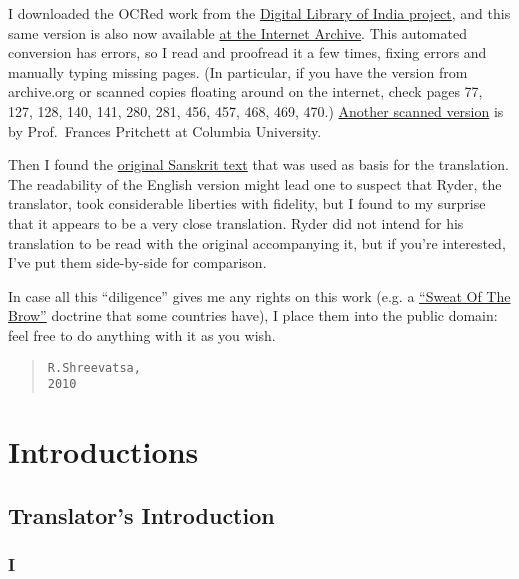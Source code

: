 \documentclass[article, twoside, 14pt]{memoir}
\renewenvironment{verbatim}{%
\begin{quote}%
\vskip -10pt%
\begin{alltt}\normalfont\large}{\end{alltt}%
\end{quote}%
\vskip -10pt
} %
\begin{document}
I downloaded the OCRed work from the
\href{http://www.new.dli.ernet.in/}{Digital Library of India project},
and this same version is also now available
\href{http://www.archive.org/details/panchatantra035159mbp}{at the Internet Archive}.
This automated conversion has errors, so I read and proofread it a
few times, fixing errors and manually typing missing pages. (In
particular, if you have the version from archive.org or scanned
copies floating around on the internet, check pages 77, 127, 128,
140, 141, 280, 281, 456, 457, 468, 469, 470.)
\href{http://www.columbia.edu/itc/mealac/pritchett/00litlinks/panchatantra_ryder/index.html}{Another scanned version}
is by Prof.~Frances Pritchett at Columbia University.

Then I found the
\href{http://books.google.com/books?id=cL_YfMZA3UgC}{original Sanskrit text}
that was used as basis for the translation. The readability of the
English version might lead one to suspect that Ryder, the
translator, took considerable liberties with fidelity, but I found
to my surprise that it appears to be a very close translation.
Ryder did not intend for his translation to be read with the
original accompanying it, but if you're interested, I've put them
side-by-side for comparison.

In case all this ``diligence'' gives me any rights on this work
(e.g. a
\href{http://www.gutenberg.org/wiki/Gutenberg:No_Sweat_of_the_Brow_Copyright}{``Sweat Of The Brow''}
doctrine that some countries have), I place them into the public
domain: feel free to do anything with it as you wish.

\begin{verbatim}
                                    R. Shreevatsa,
                                    2010
\end{verbatim}
\section{Introductions}

\subsection{Translator's Introduction}

\subsubsection{I}
\end{document}
